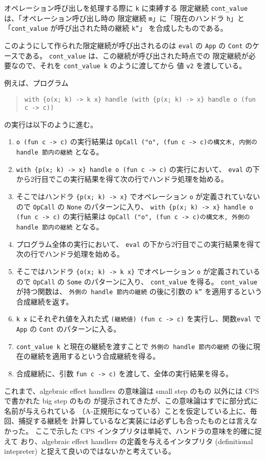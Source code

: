 オペレーション呼び出しを処理する際に \texttt{k} に束縛する
限定継続 \texttt{cont\_value} は、「オペレーション呼び出し時の
限定継続 \texttt{m}」に「現在のハンドラ \texttt{h}」と
「\texttt{cont\_value} が呼び出された時の継続 \texttt{k''}」
を合成したものである。

このようにして作られた限定継続が呼び出されるのは \texttt{eval} の
\texttt{App} の \texttt{Cont} のケースである。
\texttt{cont\_value} は、この継続が呼び出された時点での
限定継続が必要なので、それを \texttt{cont\_value k} のように渡してから
値 \texttt{v2} を渡している。

例えば、プログラム
\begin{quote}
\begin{verbatim}
with {o(x; k) -> k x} handle (with {p(x; k) -> x} handle o (fun c -> c))
\end{verbatim}
\end{quote}
の実行は以下のように進む。
\begin{enumerate}
\item
\texttt{o (fun c -> c)} の実行結果は \texttt{OpCall ("o", (fun c -> c)の構文木, 内側の handle 節内の継続} となる。
\item
\texttt{with \{p(x; k) -> x\} handle o (fun c -> c)} の実行において、
\texttt{eval} の下から2行目でこの実行結果を得て次の行でハンドラ処理を始める。
\item
そこではハンドラ \texttt{\{p(x; k) -> x\}} でオペレーション \texttt{o}
が定義されていないので \texttt{OpCall} の \texttt{None} のパターンに入り、
\texttt{with \{p(x; k) -> x\} handle o (fun c -> c)} の実行結果は
\texttt{OpCall ("o", (fun c -> c)の構文木, 外側の handle 節内の継続} となる。
\item
プログラム全体の実行において、
\texttt{eval} の下から2行目でこの実行結果を得て次の行でハンドラ処理を始める。
\item
そこではハンドラ \texttt{\{o(x; k) -> k x\}} でオペレーション \texttt{o}
が定義されているので \texttt{OpCall} の \texttt{Some} のパターンに入り、
\texttt{cont\_value} を得る。
\texttt{cont\_value} が持つ関数は、
\texttt{外側の handle 節内の継続} の後に引数の \texttt{k''} を適用するという
合成継続を返す。
\item
\texttt{k x} にそれぞれ値を入れた式 \texttt{(継続値) (fun c -> c)} を実行し、関数\texttt{eval} で
\texttt{App} の \texttt{Cont} のパターンに入る。
\item
\texttt{cont\_value k} と現在の継続を渡すことで \texttt{外側の handle 節内の継続} の後に現在の継続を適用するという合成継続を得る。
\item
合成継続に、引数 \texttt{fun c -> c)} を渡して、全体の実行結果を得る。
\end{enumerate}

これまで、algebraic effect handlers の意味論は small step のもの
\cite{10.1145/2500365.2500590, PRETNAR201519}
以外には
CPS で書かれた big step のもの
\cite{e6cb0c3222794e48bf38cf44e46fe4aa}
が提示されてきたが、この意味論はすでに部分式に名前が与えられている
（A-正規形になっている）ことを仮定している上に、毎回、捕捉する継続を
計算しているなど実装には必ずしも合ったものとは言えなかった。
ここで示した CPS インタプリタは単純で、ハンドラの意味を的確に捉えて
おり、algebraic effect handlers の定義を与えるインタプリタ (definitional
intepreter) と捉えて良いのではないかと考えている。
